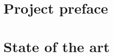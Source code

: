 \frontmatter
\setcounter{page}{1}




\cleardoublepage
{}
{}
\tableofcontents




\printglossaries
\cleardoublepage





\mainmatter

\part{Project preface}

\cleardoublepage

\part{State of the art}
\label{part:sota}





